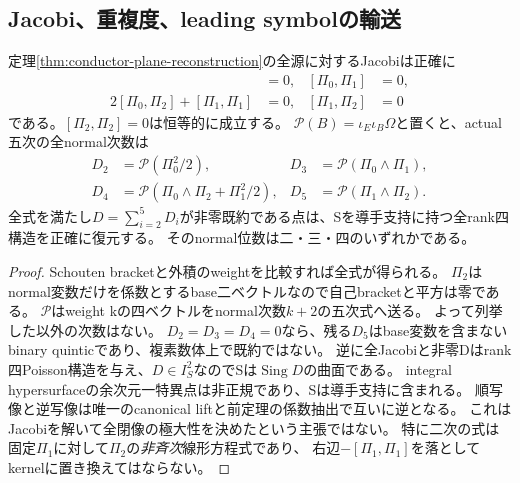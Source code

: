 \subsection{Jacobi、重複度、leading symbolの輸送}
\begin{proposition}[全高次項を含む正逆]\label{prop:conductor-master-equations}
定理\ref{thm:conductor-plane-reconstruction}の全源に対するJacobiは正確に
\begin{align*}
 [\Pi_0,\Pi_0]&=0,&[\Pi_0,\Pi_1]&=0,\\
 2[\Pi_0,\Pi_2]+[\Pi_1,\Pi_1]&=0,&[\Pi_1,\Pi_2]&=0
\end{align*}
である。$[\Pi_2,\Pi_2]=0$は恒等的に成立する。
$\mathcal P(B)=\iota_E\iota_B\Omega$と置くと、actual五次の全normal次数は
\begin{align*}
 D_2&=\mathcal P(\Pi_0^2/2),&
 D_3&=\mathcal P(\Pi_0\wedge\Pi_1),\\
 D_4&=\mathcal P(\Pi_0\wedge\Pi_2+\Pi_1^2/2),&
 D_5&=\mathcal P(\Pi_1\wedge\Pi_2).
\end{align*}
全式を満たし$D=\sum_{i=2}^5D_i$が非零既約である点は、Sを導手支持に持つ全rank四構造を正確に復元する。
そのnormal位数は二・三・四のいずれかである。
\end{proposition}
\begin{proof}
Schouten bracketと外積のweightを比較すれば全式が得られる。
$\Pi_2$はnormal変数だけを係数とするbase二ベクトルなので自己bracketと平方は零である。
$\mathcal P$はweight kの四ベクトルをnormal次数$k+2$の五次式へ送る。
よって列挙した以外の次数はない。
$D_2=D_3=D_4=0$なら、残る$D_5$はbase変数を含まないbinary quinticであり、複素数体上で既約ではない。
逆に全Jacobiと非零Dはrank四Poisson構造を与え、$D\in I_S^2$なのでSは$\operatorname{Sing}D$の曲面である。
integral hypersurfaceの余次元一特異点は非正規であり、Sは導手支持に含まれる。
順写像と逆写像は唯一のcanonical liftと前定理の係数抽出で互いに逆となる。
これはJacobiを解いて全閉像の極大性を決めたという主張ではない。
特に二次の式は固定$\Pi_1$に対して$\Pi_2$の\emph{非斉次}線形方程式であり、
右辺$-[\Pi_1,\Pi_1]$を落としてkernelに置き換えてはならない。
\end{proof}

